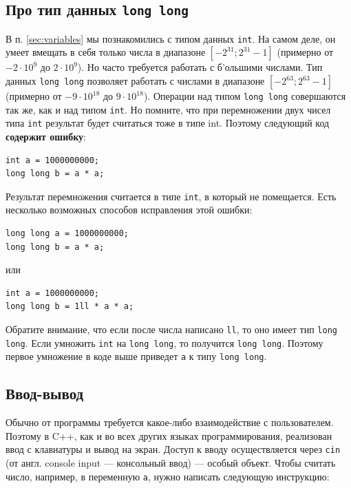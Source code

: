 \documentclass{article}
\begin{document}
	\subsection{Про тип данных \texttt{long long}}
	
	В п. \ref*{sec:variables} мы познакомились с типом данных \texttt{int}. На самом деле, он умеет вмещать в себя только числа в диапазоне $[-2^{31}; 2^{31} -1]$ (примерно от $-2\cdot 10^9$ до $2\cdot 10^9$). Но часто требуется работать с б'ольшими числами. Тип данных \texttt{long long} позволяет работать с числами в диапазоне $[-2^{63}; 2^{63}-1]$ (примерно от $-9\cdot 10^{18}$ до $9\cdot 10^{18}$). Операции над типом \texttt{long long} совершаются так же, как и над типом \texttt{int}. Но помните, что при перемножении двух чисел типа \texttt{int} результат будет считаться тоже в типе int. Поэтому следующий код \textbf{содержит ошибку}:
	
	\begin{lstlisting}
int a = 1000000000;
long long b = a * a;
	\end{lstlisting}
	
	Результат перемножения считается в типе \texttt{int}, в который не помещается. Есть несколько возможных способов исправления этой ошибки:
	
	\begin{lstlisting}
long long a = 1000000000;
long long b = a * a;
	\end{lstlisting}
	
	или
	\begin{lstlisting}
int a = 1000000000;
long long b = 1ll * a * a;
	\end{lstlisting}
	
	Обратите внимание, что если после числа написано \texttt{ll}, то оно имеет тип \texttt{long long}. Если умножить \texttt{int} на \texttt{long long}, то получится \texttt{long long}. Поэтому первое умножение в коде выше приведет \texttt{a} к типу \texttt{long long}.
	
	\subsection{Ввод-вывод}
	
	Обычно от программы требуется какое-либо взаимодействие с пользователем. Поэтому в C++, как и во всех других языках программирования, реализован ввод с клавиатуры и вывод на экран. Доступ к вводу осуществляется через \texttt{cin} (от англ. console input --- консольный ввод) --- особый объект. Чтобы считать число, например, в переменную \texttt{a}, нужно написать следующую инструкцию:
	
\end{document}
